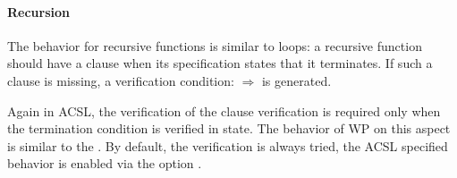 

\paragraph{Recursion}


The behavior for recursive functions is similar to loops: a recursive function
should have a  clause when its specification states that
it terminates. If such a clause is missing, a verification condition:
 $\Rightarrow$ 
is generated.




Again in ACSL, the verification of the  clause
verification is required only when the termination condition is verified in
 state. The behavior of WP on this aspect is similar to the
. By default, the verification is always tried, the
ACSL specified behavior is enabled via the option
.



